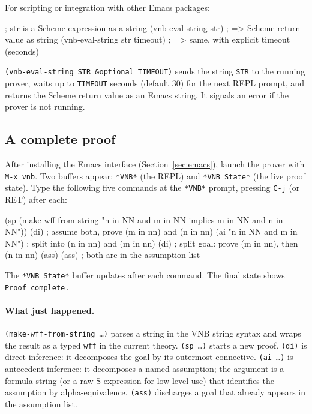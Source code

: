 \documentclass{amsbook}[openany]
\theoremstyle{definition}
\theoremstyle{remark}
\theoremstyle{remark}
\begin{document}
For scripting or integration with other Emacs packages:

\begin{VNBsnip}
; str is a Scheme expression as a string
(vnb-eval-string str)           ; => Scheme return value as string
(vnb-eval-string str timeout)   ; => same, with explicit timeout (seconds)
\end{VNBsnip}

\texttt{(vnb-eval-string STR \&optional TIMEOUT)} sends the string
\texttt{STR} to the running prover, waits up to \texttt{TIMEOUT} seconds
(default 30) for the next REPL prompt, and returns the Scheme return
value as an Emacs string.  It signals an error if the prover is not
running.

\subsection{A complete proof}
\label{sec:quickstart}

After installing the Emacs interface (Section~\ref{sec:emacs}), launch
the prover with \texttt{M-x vnb}.  Two buffers appear: \texttt{*VNB*}
(the REPL) and \texttt{*VNB State*} (the live proof state).  Type the
following five commands at the \texttt{*VNB*} prompt, pressing
\texttt{C-j} (or RET) after each:

\begin{VNBsnip}
(sp (make-wff-from-string "n in NN and m in NN implies m in NN and n in NN"))
(di)                                   ; assume both, prove (m in nn) and (n in nn)
(ai "n in NN and m in NN")            ; split into (n in nn) and (m in nn)
(di)                                   ; split goal: prove (m in nn), then (n in nn)
(ass) (ass)                            ; both are in the assumption list
\end{VNBsnip}

The \texttt{*VNB State*} buffer updates after each command.  The final
state shows \texttt{Proof complete.}

\paragraph{What just happened.}
\texttt{(make-wff-from-string \ldots)} parses a string in the VNB string
syntax and wraps the result as a typed \texttt{wff} in the current
theory.  \texttt{(sp \ldots)} starts a new proof.  \texttt{(di)} is
direct-inference: it decomposes the goal by its outermost connective.
\texttt{(ai \ldots)} is antecedent-inference: it decomposes a named
assumption; the argument is a formula string (or a raw S-expression for
low-level use) that identifies the assumption by alpha-equivalence.
\texttt{(ass)} discharges a goal that already appears in the assumption
list.
\end{document}
